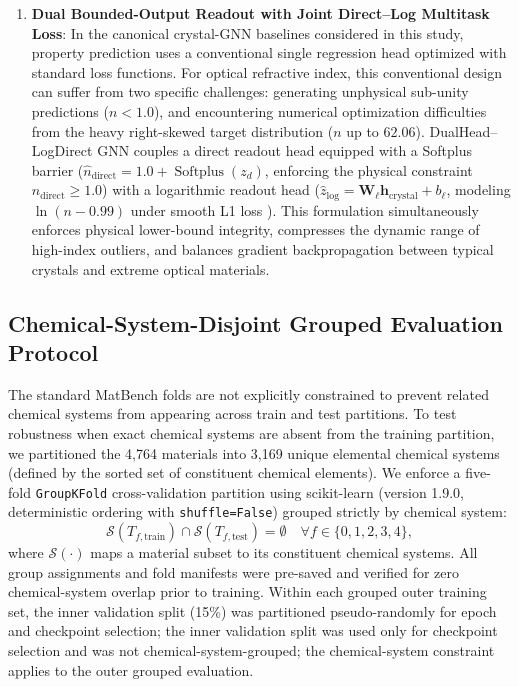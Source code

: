 \documentclass[final,3p,times]{elsarticle}
\begin{document}
\begin{enumerate}
    \item \textbf{Dual Bounded-Output Readout with Joint Direct--Log Multitask Loss}: In the canonical crystal-GNN baselines considered in this study, property prediction uses a conventional single regression head optimized with standard loss functions. For optical refractive index, this conventional design can suffer from two specific challenges: generating unphysical sub-unity predictions ($n < 1.0$), and encountering numerical optimization difficulties from the heavy right-skewed target distribution ($n$ up to $62.06$). DualHead--LogDirect GNN couples a direct readout head equipped with a Softplus barrier ($\hat{n}_{\mathrm{direct}} = 1.0 + \operatorname{Softplus}(z_d)$, enforcing the physical constraint $\hat{n}_{\mathrm{direct}} \ge 1.0$) with a logarithmic readout head ($\hat{z}_{\mathrm{log}} = \mathbf{W}_\ell \mathbf{h}_{\mathrm{crystal}} + b_\ell$, modeling $\ln(n - 0.99)$ under smooth L1 loss \cite{huber1964robust}). This formulation simultaneously enforces physical lower-bound integrity, compresses the dynamic range of high-index outliers, and balances gradient backpropagation between typical crystals and extreme optical materials.
\end{enumerate}

\subsection{Chemical-System-Disjoint Grouped Evaluation Protocol}
The standard MatBench folds are not explicitly constrained to prevent related chemical systems from appearing across train and test partitions. To test robustness when exact chemical systems are absent from the training partition, we partitioned the 4,764 materials into 3,169 unique elemental chemical systems (defined by the sorted set of constituent chemical elements). We enforce a five-fold \texttt{GroupKFold} cross-validation partition using scikit-learn (version 1.9.0, deterministic ordering with \texttt{shuffle=False}) grouped strictly by chemical system:
\begin{equation}
    \mathcal{S}(T_{f,\mathrm{train}}) \cap \mathcal{S}(T_{f,\mathrm{test}}) = \emptyset \quad \forall f \in \{0, 1, 2, 3, 4\},
\end{equation}
where $\mathcal{S}(\cdot)$ maps a material subset to its constituent chemical systems. All group assignments and fold manifests were pre-saved and verified for zero chemical-system overlap prior to training. Within each grouped outer training set, the inner validation split (15\%) was partitioned pseudo-randomly for epoch and checkpoint selection; the inner validation split was used only for checkpoint selection and was not chemical-system-grouped; the chemical-system constraint applies to the outer grouped evaluation.
\end{document}
